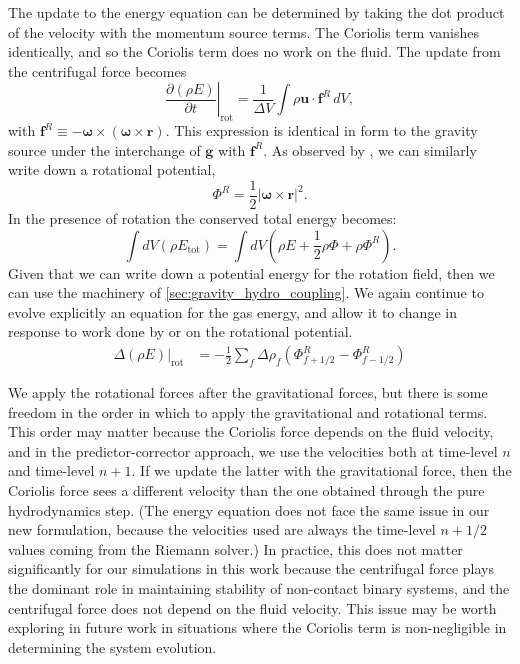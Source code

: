 \documentclass[iop,numberedappendix]{../emulateapj}
\begin{document}
The update to the energy equation can be determined by taking the dot product of the velocity
with the momentum source terms. The Coriolis term vanishes identically, and so
the Coriolis term does no work on the fluid. The update from the centrifugal force becomes
\begin{equation}
  \left.\frac{\partial(\rho E)}{\partial t}\right|_{\text{rot}} = \frac{1}{\Delta V}\int \rho \mathbf{u} \cdot \mathbf{f}^R\, dV,
\end{equation}
with $\mathbf{f}^R \equiv  -{\bm\omega} \times \left({\bm\omega} \times \mathbf{r}\right)$. 
This expression is identical in form to the gravity source under the interchange of $\mathbf{g}$ with $\mathbf{f}^R$.
As observed by \cite{marcello:2012}, we can similarly write down a rotational potential,
\begin{equation}
  \Phi^R = \frac{1}{2} \left| {\bm\omega} \times \mathbf{r} \right|^2.
\end{equation}
In the presence of rotation the conserved total energy becomes:
\begin{equation}
  \int dV (\rho E_{\text{tot}}) = \int dV \left( \rho E + \frac{1}{2} \rho \Phi + \rho \Phi^R \right).
\end{equation}
Given that we can write down a potential energy for the rotation field, then we can use the machinery of 
\autoref{sec:gravity_hydro_coupling}. We again continue to evolve explicitly an equation for 
the gas energy, and allow it to change in response to work done by or on the rotational potential.
\begin{align}
  \left.\Delta(\rho E)\right|_{\text{rot}} &= -\frac{1}{2}\sum_{f} \Delta \rho_{f} (\Phi^R_{f+1/2} - \Phi^R_{f-1/2})
\end{align}

We apply the rotational forces after the gravitational forces, but 
there is some freedom in the order in which to apply the gravitational and rotational terms.
This order may matter because the Coriolis force depends on the fluid velocity, and 
in the predictor-corrector approach, we use the velocities both at 
time-level $n$ and time-level $n+1$. If we update the latter with the gravitational force, 
then the Coriolis force sees a different velocity than the one obtained through the 
pure hydrodynamics step. (The energy equation does not face the same issue in our new formulation,
because the velocities used are always the time-level $n+1/2$ values coming from the Riemann solver.)
In practice, this does not matter significantly for our simulations in this work 
because the centrifugal force plays the dominant role in maintaining stability of non-contact 
binary systems, and the centrifugal force does not depend on the fluid velocity.
This issue may be worth exploring in future work in situations where the Coriolis 
term is non-negligible in determining the system evolution.
\end{document}
